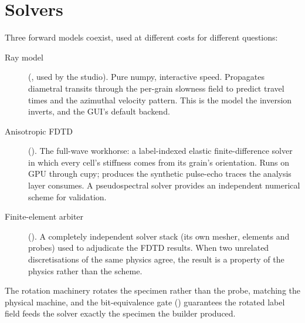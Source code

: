 \section{Solvers}

Three forward models coexist, used at different costs for different
questions:

\begin{description}
  \item[Ray model] (, used by the studio). Pure
    numpy, interactive speed. Propagates diametral transits through
    the per-grain slowness field to predict travel times and the
    azimuthal velocity pattern. This is the model the inversion
    inverts, and the GUI's default backend.
  \item[Anisotropic FDTD] (). The full-wave
    workhorse: a label-indexed elastic finite-difference solver in
    which every cell's stiffness comes from its grain's orientation.
    Runs on GPU through cupy; produces the synthetic pulse-echo
    traces the analysis layer consumes. A pseudospectral solver
    provides an independent numerical scheme for validation.
  \item[Finite-element arbiter] (). A
    completely independent solver stack (its own mesher, elements
    and probes) used to adjudicate the FDTD results. When two
    unrelated discretisations of the same physics agree, the result
    is a property of the physics rather than the scheme.
\end{description}

The rotation machinery rotates the specimen rather than the probe,
matching the physical machine, and the bit-equivalence gate
() guarantees the rotated label field feeds
the solver exactly the specimen the builder produced.

